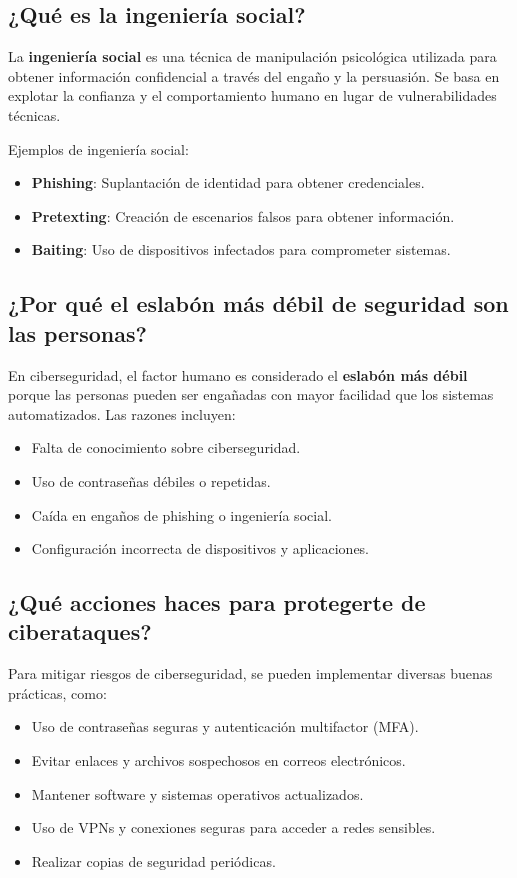 \subsection{¿Qué es la ingeniería social?}
La \textbf{ingeniería social} es una técnica de manipulación psicológica utilizada para obtener información confidencial a través del engaño y la persuasión. Se basa en explotar la confianza y el comportamiento humano en lugar de vulnerabilidades técnicas.

Ejemplos de ingeniería social:
\begin{itemize}
    \item \textbf{Phishing}: Suplantación de identidad para obtener credenciales.
    \item \textbf{Pretexting}: Creación de escenarios falsos para obtener información.
    \item \textbf{Baiting}: Uso de dispositivos infectados para comprometer sistemas.
\end{itemize}

\subsection{¿Por qué el eslabón más débil de seguridad son las personas?}
En ciberseguridad, el factor humano es considerado el \textbf{eslabón más débil} porque las personas pueden ser engañadas con mayor facilidad que los sistemas automatizados. Las razones incluyen:
\begin{itemize}
    \item Falta de conocimiento sobre ciberseguridad.
    \item Uso de contraseñas débiles o repetidas.
    \item Caída en engaños de phishing o ingeniería social.
    \item Configuración incorrecta de dispositivos y aplicaciones.
\end{itemize}

\subsection{¿Qué acciones haces para protegerte de ciberataques?}
Para mitigar riesgos de ciberseguridad, se pueden implementar diversas buenas prácticas, como:
\begin{itemize}
    \item Uso de contraseñas seguras y autenticación multifactor (MFA).
    \item Evitar enlaces y archivos sospechosos en correos electrónicos.
    \item Mantener software y sistemas operativos actualizados.
    \item Uso de VPNs y conexiones seguras para acceder a redes sensibles.
    \item Realizar copias de seguridad periódicas.
\end{itemize}

